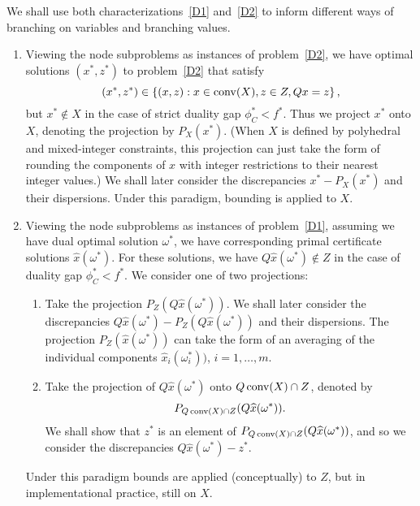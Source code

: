 We shall use both characterizations~\eqref{D1} and~\eqref{D2} to inform different ways of branching on variables and branching values. 
\begin{enumerate}
\item Viewing the node subproblems as instances of problem~\eqref{D2}, we have optimal solutions $(x^*,z^*)$ to problem~\eqref{D2} that satisfy 
$$(x^*,z^*) \in \left\{ (x,z) : x \in \operatorname{conv}(X), z \in Z, Qx=z \right \},$$ 
but $x^* \not\in X$ in the case of strict duality gap $\phi_C^* < f^*$. Thus we project $x^*$ onto $X$, denoting the projection by $P_X(x^*)$. (When $X$ is defined by polyhedral and mixed-integer constraints, this projection can just take the form of rounding the components of $x$ with integer restrictions to their nearest integer values.) We shall later consider the discrepancies $x^* - P_X(x^*)$ and their dispersions. Under this paradigm, bounding is applied to $X$.
\item Viewing the node subproblems as instances of problem~\eqref{D1}, assuming we have dual optimal solution $\omega^*$, we have corresponding primal certificate solutions $\widehat{x}(\omega^*)$. For these solutions, we have $Q\widehat{x}(\omega^*) \not\in Z$ in the case of duality gap $\phi_C^* < f^*$. We consider one of two projections:
\begin{enumerate}
\item Take the projection $P_Z(Q\widehat{x}(\omega^*))$. We shall later consider the discrepancies $Q\widehat{x}(\omega^*)-P_Z(Q\widehat{x}(\omega^*))$ and their dispersions.  The projection $P_{Z}(\widehat{x}(\omega^*))$ can take the form of an averaging of the individual components $\widehat{x}_i(\omega_i^*))$, $i=1,\dots,m$.
\item Take the projection of $Q\widehat{x}(\omega^*)$ onto $Q\operatorname{conv}(X) \cap Z$, denoted by 
$$P_{Q\operatorname{conv}(X) \cap Z}(Q\widehat{x}(\omega^*)).$$ We shall show that
$z^*$ is an element of $P_{Q\operatorname{conv}(X) \cap Z}(Q\widehat{x}(\omega^*))$, and so we consider the discrepancies $Q\widehat{x}(\omega^*)-z^*$.
\end{enumerate}
Under this paradigm bounds are applied (conceptually) to $Z$, but in implementational practice, still on $X$.
\end{enumerate}



